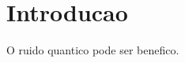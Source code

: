 \hypertarget{introducao}{%
\section{Introducao}\label{introducao}}

O ruido quantico pode ser benefico.
